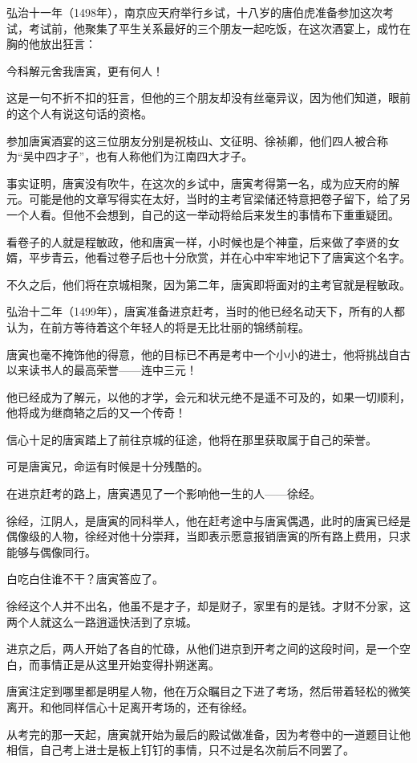 \begin{multicols}{\theparacolNo}
弘治十一年（1498年），南京应天府举行乡试，十八岁的唐伯虎准备参加这次考试，考试前，他聚集了平生关系最好的三个朋友一起吃饭，在这次酒宴上，成竹在胸的他放出狂言：

今科解元舍我唐寅，更有何人！

这是一句不折不扣的狂言，但他的三个朋友却没有丝毫异议，因为他们知道，眼前的这个人有说这句话的资格。

参加唐寅酒宴的这三位朋友分别是祝枝山、文征明、徐祯卿，他们四人被合称为“吴中四才子”，也有人称他们为江南四大才子。

事实证明，唐寅没有吹牛，在这次的乡试中，唐寅考得第一名，成为应天府的解元。可能是他的文章写得实在太好，当时的主考官梁储还特意把卷子留下，给了另一个人看。但他不会想到，自己的这一举动将给后来发生的事情布下重重疑团。

看卷子的人就是程敏政，他和唐寅一样，小时候也是个神童，后来做了李贤的女婿，平步青云，他看过卷子后也十分欣赏，并在心中牢牢地记下了唐寅这个名字。

不久之后，他们将在京城相聚，因为第二年，唐寅即将面对的主考官就是程敏政。

弘治十二年（1499年），唐寅准备进京赶考，当时的他已经名动天下，所有的人都认为，在前方等待着这个年轻人的将是无比壮丽的锦绣前程。

唐寅也毫不掩饰他的得意，他的目标已不再是考中一个小小的进士，他将挑战自古以来读书人的最高荣誉——连中三元！

他已经成为了解元，以他的才学，会元和状元绝不是遥不可及的，如果一切顺利，他将成为继商辂之后的又一个传奇！

信心十足的唐寅踏上了前往京城的征途，他将在那里获取属于自己的荣誉。

可是唐寅兄，命运有时候是十分残酷的。

在进京赶考的路上，唐寅遇见了一个影响他一生的人——徐经。

徐经，江阴人，是唐寅的同科举人，他在赶考途中与唐寅偶遇，此时的唐寅已经是偶像级的人物，徐经对他十分崇拜，当即表示愿意报销唐寅的所有路上费用，只求能够与偶像同行。

白吃白住谁不干？唐寅答应了。

徐经这个人并不出名，他虽不是才子，却是财子，家里有的是钱。才财不分家，这两个人就这么一路逍遥快活到了京城。

进京之后，两人开始了各自的忙碌，从他们进京到开考之间的这段时间，是一个空白，而事情正是从这里开始变得扑朔迷离。

唐寅注定到哪里都是明星人物，他在万众瞩目之下进了考场，然后带着轻松的微笑离开。和他同样信心十足离开考场的，还有徐经。

从考完的那一天起，唐寅就开始为最后的殿试做准备，因为考卷中的一道题目让他相信，自己考上进士是板上钉钉的事情，只不过是名次前后不同罢了。


\end{multicols}
